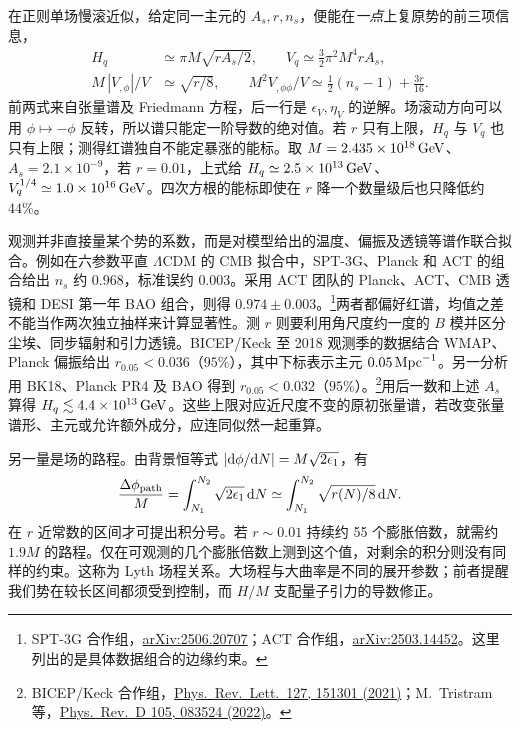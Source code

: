 在正则单场慢滚近似，给定同一主元的 $A_s,r,n_s$，便能在\emph{一点}上复原势的前三项信息，
\begin{align}
 H_q&\simeq\pi M\sqrt{r A_s/2},\qquad
 V_q\simeq\tfrac32\pi^2 M^4 r A_s,\nonumber\\
 M\,|V_{,\phi}|/V&\simeq\sqrt{r/8},\qquad
 M^2 V_{,\phi\phi}/V\simeq\tfrac12(n_s-1)+\tfrac{3r}{16}.
 \label{eq:cosmo-inf-reconstruct}
\end{align}
前两式来自张量谱及 Friedmann 方程，后一行是 $\epsilon_V,\eta_V$ 的逆解。场滚动方向可以用 $\phi\mapsto-\phi$ 反转，所以谱只能定一阶导数的绝对值。若 $r$ 只有上限，$H_q$ 与 $V_q$ 也只有上限；测得红谱独自不能定暴涨的能标。取 $M=2.435\times10^{18}\,{\rm GeV}$、$A_s=2.1\times10^{-9}$，若 $r=0.01$，上式给 $H_q\simeq2.5\times10^{13}\,{\rm GeV}$、$V_q^{1/4}\simeq1.0\times10^{16}\,{\rm GeV}$。四次方根的能标即使在 $r$ 降一个数量级后也只降低约 $44\%$。

观测并非直接量某个势的系数，而是对模型给出的温度、偏振及透镜等谱作联合拟合。例如在六参数平直 $\Lambda$CDM 的 CMB 拟合中，SPT-3G、Planck 和 ACT 的组合给出 $n_s$ 约 $0.968$，标准误约 $0.003$。采用 ACT 团队的 Planck、ACT、CMB 透镜和 DESI 第一年 BAO 组合，则得 $0.974\pm0.003$。\footnote{SPT-3G 合作组，\href{https://arxiv.org/abs/2506.20707}{arXiv:2506.20707}；ACT 合作组，\href{https://arxiv.org/abs/2503.14452}{arXiv:2503.14452}。这里列出的是具体数据组合的边缘约束。}两者都偏好红谱，均值之差不能当作两次独立抽样来计算显著性。测 $r$ 则要利用角尺度约一度的 $B$ 模并区分尘埃、同步辐射和引力透镜。BICEP/Keck 至 2018 观测季的数据结合 WMAP、Planck 偏振给出 $r_{0.05}<0.036$（$95\%$），其中下标表示主元 $0.05\,{\rm Mpc}^{-1}$。另一分析用 BK18、Planck PR4 及 BAO 得到 $r_{0.05}<0.032$（$95\%$）。\footnote{BICEP/Keck 合作组，\href{https://doi.org/10.1103/PhysRevLett.127.151301}{Phys.\ Rev.\ Lett.\ 127, 151301 (2021)}；M.~Tristram 等，\href{https://doi.org/10.1103/PhysRevD.105.083524}{Phys.\ Rev.\ D 105, 083524 (2022)}。}用后一数和上述 $A_s$ 算得 $H_q\lesssim4.4\times10^{13}\,{\rm GeV}$。这些上限对应近尺度不变的原初张量谱，若改变张量谱形、主元或允许额外成分，应连同似然一起重算。

另一量是场的路程。由背景恒等式 $|\dd\phi/\dd N|=M\sqrt{2\epsilon_1}$，有
\[
 \frac{\Delta\phi_{\rm path}}M
 =\int_{N_1}^{N_2}\sqrt{2\epsilon_1}\,\dd N
 \simeq\int_{N_1}^{N_2}\sqrt{r(N)/8}\,\dd N .
\]
在 $r$ 近常数的区间才可提出积分号。若 $r\sim0.01$ 持续约 55 个膨胀倍数，就需约 $1.9M$ 的路程。仅在可观测的几个膨胀倍数上测到这个值，对剩余的积分则没有同样的约束。这称为 Lyth 场程关系。大场程与大曲率是不同的展开参数；前者提醒我们势在较长区间都须受到控制，而 $H/M$ 支配量子引力的导数修正。

